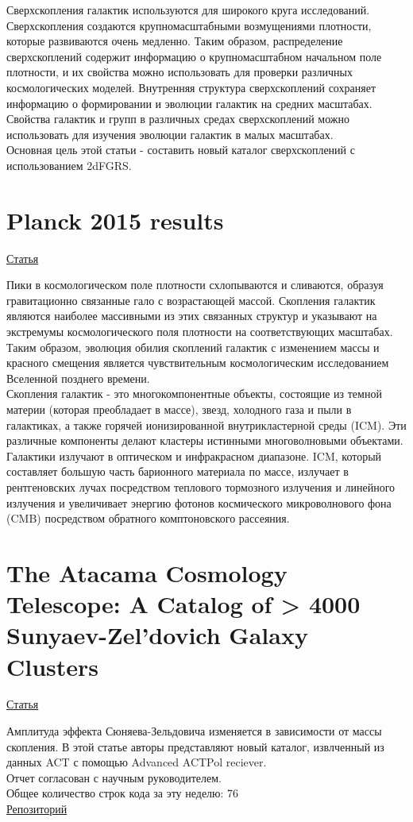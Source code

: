 \documentclass{article}
\begin{document}
Сверхскопления галактик используются для широкого круга исследований. Сверхскопления создаются
крупномасштабными возмущениями плотности, которые развиваются очень медленно. Таким образом, 
распределение сверхскоплений содержит информацию о крупномасштабном начальном поле плотности, и их 
свойства можно использовать для проверки различных космологических моделей. Внутренняя структура
сверхскоплений сохраняет информацию о формировании и эволюции галактик на средних масштабах. 
Свойства галактик и групп в различных средах сверхскоплений можно использовать для изучения 
эволюции галактик в малых масштабах.\\

Основная цель этой статьи - составить новый каталог сверхскоплений с использованием 2dFGRS.\\

\section{Planck 2015 results}
\hyperlink{https://www.aanda.org/articles/aa/pdf/2016/10/aa25823-15.pdf}{Статья}

Пики в космологическом поле плотности схлопываются и сливаются, образуя гравитационно связанные 
гало с возрастающей массой. Скопления галактик являются наиболее массивными из этих связанных 
структур и указывают на экстремумы космологического поля плотности на соответствующих масштабах.
Таким образом, эволюция обилия скоплений галактик с изменением массы и красного смещения является
чувствительным космологическим исследованием Вселенной позднего времени.\\

Скопления галактик - это многокомпонентные объекты, состоящие из темной материи (которая 
преобладает в массе), звезд, холодного газа и пыли в галактиках, а также горячей ионизированной
внутрикластерной среды (ICM). Эти различные компоненты делают кластеры истинными многоволновыми 
объектами. Галактики излучают в оптическом и инфракрасном диапазоне. ICM, который составляет 
большую часть барионного материала по массе, излучает в рентгеновских лучах посредством теплового
тормозного излучения и линейного излучения и увеличивает энергию фотонов космического микроволнового 
фона (CMB) посредством обратного комптоновского рассеяния.\\

\section{The Atacama Cosmology Telescope: A Catalog of > 4000 Sunyaev-Zel’dovich Galaxy Clusters}
\hyperlink{https://arxiv.org/pdf/2009.11043.pdf}{Статья}

Амплитуда эффекта Сюняева-Зельдовича изменяется в зависимости от массы скопления. В этой статье 
авторы представляют новый каталог, извлченный из данных ACT с помощью Advanced ACTPol reciever.\\

Отчет согласован с научным руководителем.\\
Общее количество строк кода за эту неделю: 76\\
\hyperlink{https://github.com/rt2122/data-segmentation-2}{Репозиторий}\\ 
\end{document}
